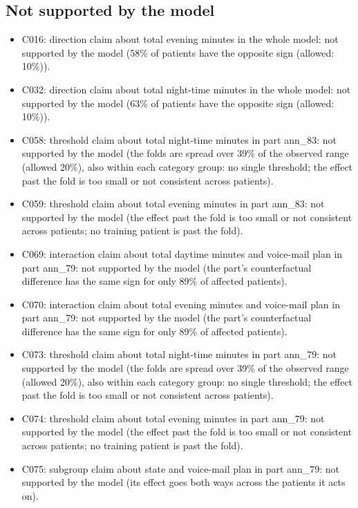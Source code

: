 \documentclass[a4paper,10pt]{article}
\newif\ifreviewmarks
\newcommand{\reviewrule}{\noindent{\color{BrickRed}\rule{\linewidth}{0.8pt}}}
\newenvironment{drafted}[1][]{%
  \ifreviewmarks\par\addvspace{\medskipamount}\reviewrule\par\nopagebreak
  \noindent{\color{BrickRed}\sffamily\footnotesize\textbf{Thesis Draft}\quad #1\hfill review}\par\nopagebreak\smallskip\fi}{%
  \ifreviewmarks\par\smallskip\noindent{\color{BrickRed}\sffamily\footnotesize end of thesis draft}\par\nopagebreak\reviewrule\par\medskip\fi}
\begin{document}
\begin{drafted}[plain-language layer: churn100-s7-c1]
\subsection{Not supported by the model}
\begin{itemize}\setlength\itemsep{0pt}\small
\item C016: direction claim about total evening minutes in the whole model: not supported by the model (58\% of patients have the opposite sign (allowed: 10\%)).
\item C032: direction claim about total night-time minutes in the whole model: not supported by the model (63\% of patients have the opposite sign (allowed: 10\%)).
\item C058: threshold claim about total night-time minutes in part ann\_\allowbreak{}83: not supported by the model (the folds are spread over 39\% of the observed range (allowed 20\%), also within each category group: no single threshold; the effect past the fold is too small or not consistent across patients).
\item C059: threshold claim about total evening minutes in part ann\_\allowbreak{}83: not supported by the model (the effect past the fold is too small or not consistent across patients; no training patient is past the fold).
\item C069: interaction claim about total daytime minutes and voice-mail plan in part ann\_\allowbreak{}79: not supported by the model (the part's counterfactual difference has the same sign for only 89\% of affected patients).
\item C070: interaction claim about total evening minutes and voice-mail plan in part ann\_\allowbreak{}79: not supported by the model (the part's counterfactual difference has the same sign for only 89\% of affected patients).
\item C073: threshold claim about total night-time minutes in part ann\_\allowbreak{}79: not supported by the model (the folds are spread over 39\% of the observed range (allowed 20\%), also within each category group: no single threshold; the effect past the fold is too small or not consistent across patients).
\item C074: threshold claim about total evening minutes in part ann\_\allowbreak{}79: not supported by the model (the effect past the fold is too small or not consistent across patients; no training patient is past the fold).
\item C075: subgroup claim about state and voice-mail plan in part ann\_\allowbreak{}79: not supported by the model (its effect goes both ways across the patients it acts on).

\end{itemize}
\end{drafted}
\end{document}
